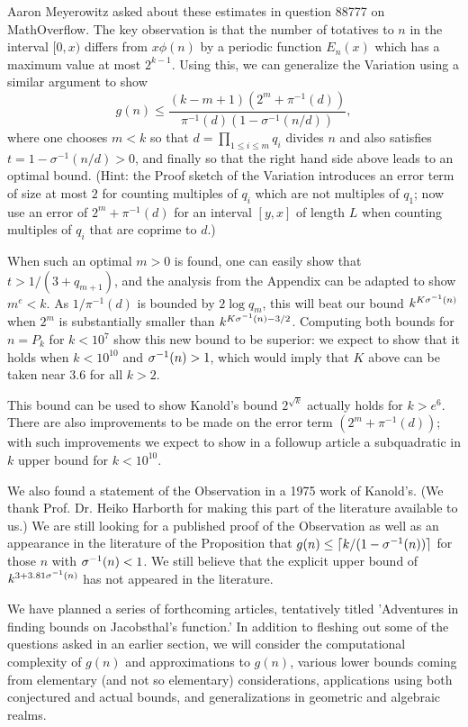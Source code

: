 \documentclass[12pt,leqno]{article}
\begin{document}
Aaron Meyerowitz asked about these estimates in question 88777 
on MathOverflow.  The
key observation is that the number of totatives to $n$ in the
interval $[0,x)$ differs from $x\phi(n)$ by a periodic function 
$E_n(x)$ which has a maximum value at most $2^{k - 1}$.  Using 
this, we can generalize the Variation using a similar argument 
to show
$$ g(n) \leq 
\frac{(k-m+1)(2^m + \pi^{-1}(d))}{\pi^{-1}(d)(1 - \sigma^{-1}(n/d))},$$
where one chooses $m \lt k$ so that $d=\prod_{1 \leq i \leq m} q_i$ 
divides $n$ and also satisfies
$t=1-\sigma^{-1}(n/d) \gt 0$, and finally so that the 
right hand side above leads to an optimal bound. (Hint:
the Proof sketch of the Variation introduces an error term of 
size at most $2$ for counting multiples of $q_i$ which are not 
multiples of $q_1$; now use an error of $2^m + \pi^{-1}(d)$ 
for an interval $[y,x]$ of length $L$ when counting multiples 
of $q_i$ that are coprime to $d$.)

When such an optimal $m>0$ is found, one can easily show that 
$t > 1/(3+q_{m+1})$, and the analysis from the Appendix can 
be adapted to show $m^e \lt k$.  As $1/\pi^{-1}(d)$ is bounded by 
$2\log q_m$, this will beat our bound $k^{K{\sigma}^{-1}(n)}$ when 
$2^m$ is substantially smaller than $k^{K{\sigma}^{-1}(n) -3/2}$. 
Computing both bounds for $n=P_k$ for $k<10^7$ show this new
bound to be superior: we expect to show that it holds when
$k < 10^{10}$ and ${\sigma}^{-1}(n) > 1$, which would imply that $K$ above
can be taken near $3.6$ for all $k \gt 2$.

This bound can be used to show Kanold's bound $2^{\sqrt{k}}$ 
actually holds for $k \gt e^6$.  There are also improvements
to be made on the error term $(2^m + \pi^{-1}(d))$; with
such improvements we expect to show in a followup article a 
subquadratic in $k$ upper bound for $k< 10^{10}$.

We also found a statement of the Observation in a 1975 work of
Kanold's.  (We thank Prof. Dr. Heiko Harborth for making this
part of the literature available to us.) 
We are still looking for a published proof of the
Observation as well as an appearance in the literature of the
Proposition that $g(n) \leq \lceil k/(1-{\sigma}^{-1}(n)) \rceil$ for those $n$ with
${\sigma}^{-1}(n) < 1$.  We still believe that the explicit upper bound of
$k^{3 + 3.81{\sigma}^{-1}(n)}$ has not appeared in the literature.


We have planned a series of forthcoming articles, tentatively titled
'Adventures in finding bounds on Jacobsthal's function.'  In addition
to fleshing out some of the questions asked in an earlier section, we
will consider the computational complexity of $g(n)$ and approximations to
$g(n)$,
various lower bounds coming from elementary (and not so elementary)
considerations, applications using both conjectured and actual bounds,
and generalizations in geometric and algebraic realms.
\end{document}
